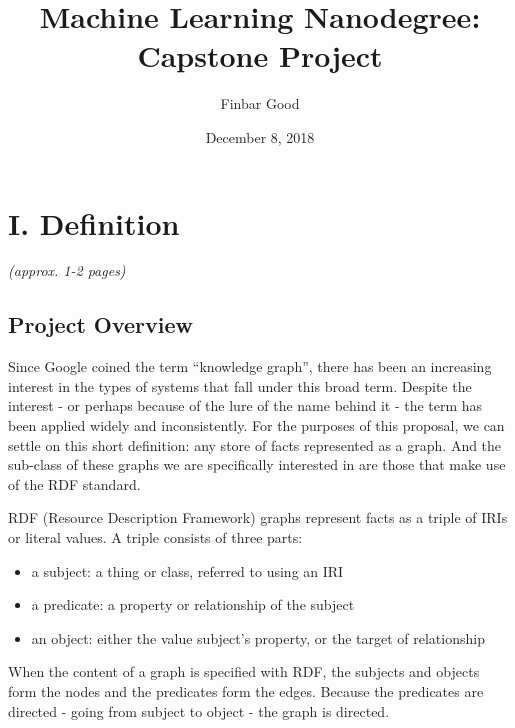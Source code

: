 \documentclass[12pt]{article}
\begin{document}
\title{Machine Learning Nanodegree: Capstone Project}
\author{Finbar Good}
\date{December 8, 2018}

\maketitle
   
\setlength{\parindent}{0cm}
\setlength{\parskip}{0.5\baselineskip}

\section{I. Definition}\label{i.-definition}

\emph{(approx. 1-2 pages)}

\subsection{Project Overview}\label{project-overview}
Since Google coined the term ``knowledge graph'', there has been an
increasing interest in the types of systems that fall under this broad
term\cite{ehrlinger2016towards}. Despite the interest - or perhaps
because of the lure of the name behind it - the term has been applied
widely and inconsistently. For the purposes of this proposal, we can
settle on this short definition: any store of facts represented as a
graph. And the sub-class of these graphs we are specifically interested
in are those that make use of the RDF standard.

RDF (Resource Description Framework) graphs \cite{w3RDF} represent facts
as a triple of IRIs or literal values. A triple consists of three parts:

\begin{itemize}
\item
  a subject: a thing or class, referred to using an IRI
\item
  a predicate: a property or relationship of the subject
\item
  an object: either the value subject's property, or the target of
  relationship
\end{itemize}

When the content of a graph is specified with RDF, the subjects and
objects form the nodes and the predicates form the edges. Because the
predicates are directed - going from subject to object - the graph is
directed.
\end{document}
